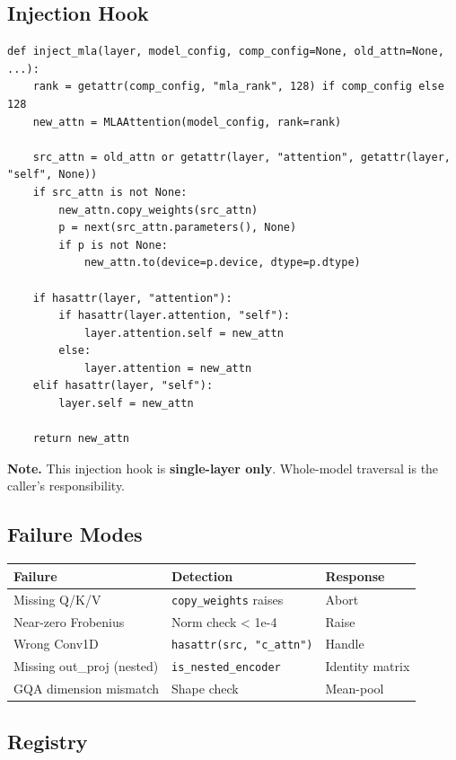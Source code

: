 \subsection{Injection Hook}

\begin{lstlisting}
def inject_mla(layer, model_config, comp_config=None, old_attn=None, ...):
    rank = getattr(comp_config, "mla_rank", 128) if comp_config else 128
    new_attn = MLAAttention(model_config, rank=rank)
    
    src_attn = old_attn or getattr(layer, "attention", getattr(layer, "self", None))
    if src_attn is not None:
        new_attn.copy_weights(src_attn)
        p = next(src_attn.parameters(), None)
        if p is not None:
            new_attn.to(device=p.device, dtype=p.dtype)
    
    if hasattr(layer, "attention"):
        if hasattr(layer.attention, "self"):
            layer.attention.self = new_attn
        else:
            layer.attention = new_attn
    elif hasattr(layer, "self"):
        layer.self = new_attn
    
    return new_attn
\end{lstlisting}

\textbf{Note.} This injection hook is \textbf{single-layer only}. Whole-model traversal 
is the caller's responsibility.

\subsection{Failure Modes}

\begin{table}[H]
\centering
\small
\begin{tabular}{lll}
\toprule
\textbf{Failure} & \textbf{Detection} & \textbf{Response} \\
\midrule
Missing Q/K/V & \texttt{copy\_weights} raises & Abort \\
Near-zero Frobenius & Norm check < 1e-4 & Raise \\
Wrong Conv1D & \texttt{hasattr(src, "c\_attn")} & Handle \\
Missing out\_proj (nested) & \texttt{is\_nested\_encoder} & Identity matrix \\
GQA dimension mismatch & Shape check & Mean-pool \\
\bottomrule
\end{tabular}
\end{table}

\subsection{Registry}

